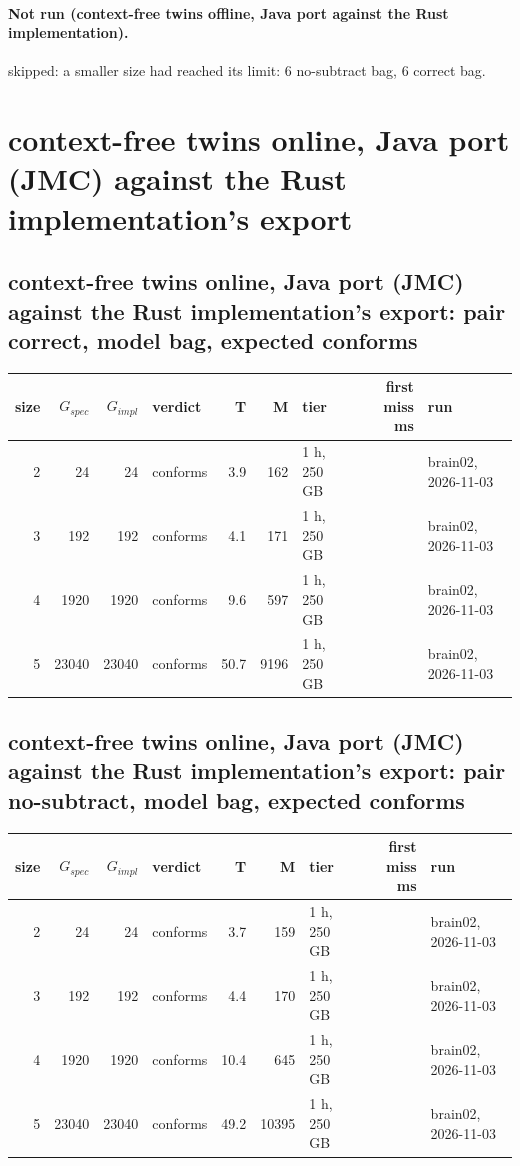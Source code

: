 \documentclass[10pt]{article}
\begin{document}
\paragraph{Not run (context-free twins offline, Java port against the Rust implementation).}
skipped: a smaller size had reached its limit: 6 no-subtract bag, 6 correct bag.\par
\section*{context-free twins online, Java port (JMC) against the Rust implementation's export}
\subsection*{context-free twins online, Java port (JMC) against the Rust implementation's export: pair \textsf{correct}, model bag, expected conforms}
\begin{longtable}{@{}rrrlrrlrl@{}}
\toprule
size & $G_{\mathit{spec}}$ & $G_{\mathit{impl}}$ & verdict & T & M & tier & first miss ms & run \\
\midrule
\endhead
\color{red} 2 & 24 & 24 & conforms & 3.9 & 162 & 1 h, 250 GB &  & brain02, 2026-11-03 \\
\color{red} 3 & 192 & 192 & conforms & 4.1 & 171 & 1 h, 250 GB &  & brain02, 2026-11-03 \\
\color{red} 4 & 1920 & 1920 & conforms & 9.6 & 597 & 1 h, 250 GB &  & brain02, 2026-11-03 \\
\color{red} 5 & 23040 & 23040 & conforms & 50.7 & 9196 & 1 h, 250 GB &  & brain02, 2026-11-03 \\
\bottomrule
\end{longtable}
\subsection*{context-free twins online, Java port (JMC) against the Rust implementation's export: pair \textsf{no-subtract}, model bag, expected conforms}
\begin{longtable}{@{}rrrlrrlrl@{}}
\toprule
size & $G_{\mathit{spec}}$ & $G_{\mathit{impl}}$ & verdict & T & M & tier & first miss ms & run \\
\midrule
\endhead
\color{red} 2 & 24 & 24 & conforms & 3.7 & 159 & 1 h, 250 GB &  & brain02, 2026-11-03 \\
\color{red} 3 & 192 & 192 & conforms & 4.4 & 170 & 1 h, 250 GB &  & brain02, 2026-11-03 \\
\color{red} 4 & 1920 & 1920 & conforms & 10.4 & 645 & 1 h, 250 GB &  & brain02, 2026-11-03 \\
\color{red} 5 & 23040 & 23040 & conforms & 49.2 & 10395 & 1 h, 250 GB &  & brain02, 2026-11-03 \\
\bottomrule
\end{longtable}
\end{document}
